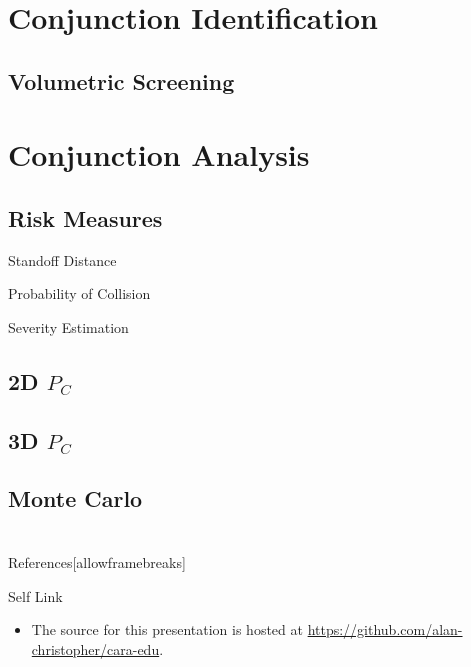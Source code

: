 \documentclass[pdf]{beamer}
\makeatletter
\def\beamer@writeslidentry@miniframesoff{%
  \expandafter\beamer@ifempty\expandafter{\beamer@framestartpage}{}%
  {%
    \clearpage\beamer@notesactions%
  }
}
\newcommand*{\miniframesoff}{\let\beamer@writeslidentry=\beamer@writeslidentry@miniframesoff}
\makeatother
\begin{document}
\section{Conjunction Identification}
\subsection{Volumetric Screening}

\section{Conjunction Analysis}
\subsection{Risk Measures}

\begin{frame}{Standoff Distance}
\end{frame}

\begin{frame}{Probability of Collision}
\end{frame}

\begin{frame}{Severity Estimation}
\end{frame}

\subsection{2D $P_C$}

\subsection{3D $P_C$}

\subsection{Monte Carlo}

\miniframesoff
\section*{}
\begin{frame}{References}[allowframebreaks]
    \tiny
\end{frame}

\begin{frame}{Self Link}
  \begin{itemize}
  \item The source for this presentation is hosted at
    \url{https://github.com/alan-christopher/cara-edu}.
  \end{itemize}
\end{frame}
\end{document}
